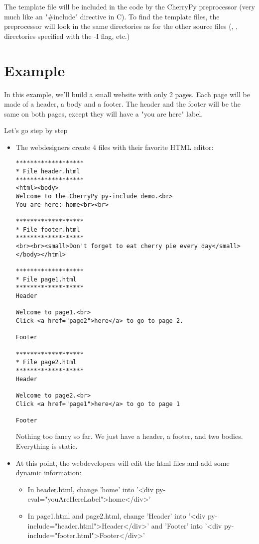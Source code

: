 \documentclass{manual}
\begin{document}
The template file will be included in the code by the CherryPy preprocessor (very much like an "\#include" directive in C).
To find the template files, the preprocessor will look in the same directories as for the other source files
(, , directories specified with the -I flag, etc.)

\section{Example}
In this example, we'll build a small website with only 2 pages. Each page will be made of a header, a body and a footer.
The header and the footer will be the same on both pages, except they will have a "you are here" label.

Let's go step by step
\begin{itemize}
\item
The webdesigners create 4 files with their favorite HTML editor:

\begin{verbatim}
*******************
* File header.html
*******************
<html><body>
Welcome to the CherryPy py-include demo.<br>
You are here: home<br><br>

*******************
* File footer.html
*******************
<br><br><small>Don't forget to eat cherry pie every day</small>
</body></html>

*******************
* File page1.html
*******************
Header

Welcome to page1.<br>
Click <a href="page2">here</a> to go to page 2.

Footer

*******************
* File page2.html
*******************
Header

Welcome to page2.<br>
Click <a href="page1">here</a> to go to page 1

Footer
\end{verbatim}
Nothing too fancy so far. We just have a header, a footer, and two bodies. Everything is static.

\item
At this point, the webdevelopers will edit the html files and add some dynamic information:
\begin{itemize}
\item
In header.html, change 'home' into '<div py-eval="youAreHereLabel">home</div>'
\item
In page1.html and page2.html, change 'Header' into '<div py-include="header.html">Header</div>' and 'Footer' into
'<div py-include="footer.html">Footer</div>'
\end{itemize}


\end{itemize}
\end{document}
